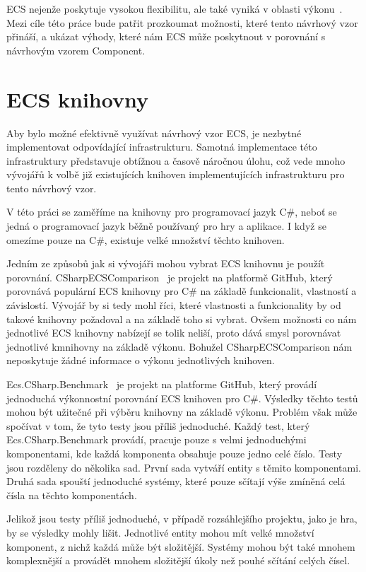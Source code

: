 ECS nejenže poskytuje vysokou flexibilitu, ale také vyniká v oblasti výkonu~\cite{Caini_2019}. Mezi cíle této práce bude patřit prozkoumat možnosti, které tento návrhový vzor přináší, a ukázat výhody, které nám ECS může poskytnout v porovnání s návrhovým vzorem Component.

\section{ECS knihovny}
Aby bylo možné efektivně využívat návrhový vzor ECS, je nezbytné implementovat odpovídající infrastrukturu. Samotná implementace této infrastruktury představuje obtížnou a časově náročnou úlohu, což vede mnoho vývojářů k volbě již existujících knihoven implementujících infrastrukturu pro tento návrhový vzor.

V této práci se zaměříme na knihovny pro programovací jazyk C\#, neboť se jedná o programovací jazyk běžně používaný pro hry a aplikace. I když se omezíme pouze na C\#, existuje velké množství těchto knihoven.

Jedním ze způsobů jak si vývojáři mohou vybrat ECS knihovnu je použít porovnání. CSharpECSComparison~\cite{CSharpECSComparison} je projekt na platformě GitHub, který porovnává populární ECS knihovny pro C\# na základě funkcionalit, vlastností a závislostí. Vývojář by si tedy mohl říci, které vlastnosti a funkcionality by od takové knihovny požadoval a na základě toho si vybrat. Ovšem možnosti co nám jednotlivé ECS knihovny nabízejí se tolik neliší, proto dává smysl porovnávat jednotlivé kmnihovny na základě výkonu. Bohužel CSharpECSComparison nám neposkytuje žádné informace o výkonu jednotlivých knihoven.

Ecs.CSharp.Benchmark~\cite{EcsCsharpBenchmark} je projekt na platforme GitHub, který provádí jednoduchá výkonnostní porovnání ECS knihoven pro C\#. Výsledky těchto testů mohou být užitečné při výběru knihovny na základě výkonu. Problém však může spočívat v tom, že tyto testy jsou příliš jednoduché. Každý test, který Ecs.CSharp.Benchmark provádí, pracuje pouze s velmi jednoduchými komponentami, kde každá komponenta obsahuje pouze jedno celé číslo. Testy jsou rozděleny do několika sad. První sada vytváří entity s těmito komponentami. Druhá sada spouští jednoduché systémy, které pouze sčítají výše zmíněná celá čísla na těchto komponentách.

Jelikož jsou testy příliš jednoduché, v případě rozsáhlejšího projektu, jako je hra, by se výsledky mohly lišit. Jednotlivé entity mohou mít velké množství komponent, z nichž každá může být složitější. Systémy mohou být také mnohem komplexnější a provádět mnohem složitější úkoly než pouhé sčítání celých čísel.

